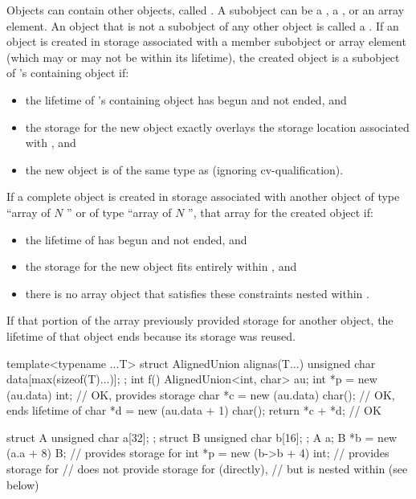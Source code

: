\pnum
{}%
Objects can contain other objects, called .
A subobject can be
a , a ,
or an array element.
%
An object that is not a subobject of any other object is called a .
If an object is created
in storage associated with a member subobject or array element 
(which may or may not be within its lifetime),
the created object
is a subobject of 's containing object if:
\begin{itemize}
\item
the lifetime of 's containing object has begun and not ended, and
\item
the storage for the new object exactly overlays the storage location associated with , and
\item
the new object is of the same type as  (ignoring cv-qualification).
\end{itemize}

\pnum
{}%
If a complete object is created
in storage associated with another object 
of type ``array of $N$ '' or
of type ``array of $N$ '',
that array 
for the created object if:
\begin{itemize}
\item
the lifetime of  has begun and not ended, and
\item
the storage for the new object fits entirely within , and
\item
there is no array object that satisfies these constraints nested within .
\end{itemize}
\begin{note}
If that portion of the array
previously provided storage for another object,
the lifetime of that object ends
because its storage was reused.
\end{note}
\begin{example}
\begin{codeblock}
template<typename ...T>
struct AlignedUnion {
  alignas(T...) unsigned char data[max(sizeof(T)...)];
};
int f() {
  AlignedUnion<int, char> au;
  int *p = new (au.data) int;           // OK,  provides storage
  char *c = new (au.data) char();       // OK, ends lifetime of 
  char *d = new (au.data + 1) char();
  return *c + *d;                       // OK
}

struct A { unsigned char a[32]; };
struct B { unsigned char b[16]; };
A a;
B *b = new (a.a + 8) B;                 //  provides storage for 
int *p = new (b->b + 4) int;            //  provides storage for 
                                        //  does not provide storage for  (directly),
                                        // but  is nested within  (see below)
\end{codeblock}
\end{example}

